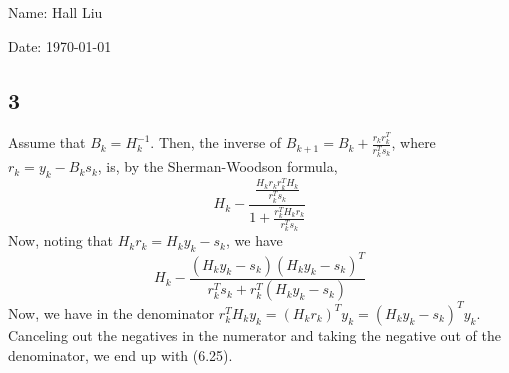 \documentclass{article}
\begin{document}
Name: Hall Liu

Date: \today 
\vspace{1.5cm}

\subsection*{3}
Assume that $B_k=H_k^{-1}$. Then, the inverse of $B_{k+1}=B_k+\frac{r_kr_k^T}{r_k^Ts_k}$, where $r_k=y_k-B_ks_k$, is, by the Sherman-Woodson formula, 
\[H_k-\frac{\frac{H_kr_kr_k^TH_k}{r_k^Ts_k}}{1+\frac{r_k^TH_kr_k}{r_k^Ts_k}}\]
Now, noting that $H_kr_k=H_ky_k-s_k$, we have
\[H_k-\frac{(H_ky_k-s_k)(H_ky_k-s_k)^T}{r_k^Ts_k+r_k^T(H_ky_k-s_k)}\]
Now, we have in the denominator $r_k^TH_ky_k=(H_kr_k)^Ty_k=(H_ky_k-s_k)^Ty_k$. Canceling out the negatives in the numerator and taking the negative out of the denominator, we end up with (6.25).
\end{document}
